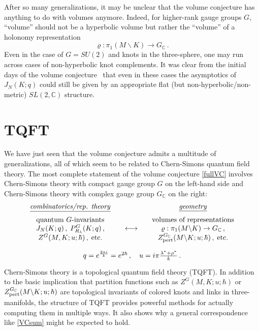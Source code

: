 \documentclass[letterpaper,12pt]{article}
\numberwithin{equation}{section}
\newcommand{\be}{\begin{equation}}
\newcommand{\ee}{\end{equation}}
\newcommand{\bs}{\backslash}
\newcommand{\C}{{\mathbb{C}}}
\renewcommand{\=}{\;=\;}
\begin{document}
After so many generalizations,
it may be unclear that the volume conjecture has anything to do with volumes anymore.
Indeed, for higher-rank gauge groups $G$,
``volume'' should not be a hyperbolic volume but rather
the ``volume'' of a holonomy representation
%
\be \varrho : \pi_1 (M\bs K) \to G_{\C}\,. \label{rhofirst} \ee
%
Even in the case of $G=SU(2)$ and knots in the three-sphere,
one may run across cases of non-hyperbolic knot complements.
It was clear from the initial days of the volume conjecture~\cite{Mur-Mur}
that even in these cases the asymptotics of $J_N(K;q)$
could still be given by an appropriate flat (but non-hyperbolic/non-metric) $SL(2,\C)$ structure.


\section{TQFT}
\label{sec:TQFT}

We have just seen that the volume conjecture admits a multitude of generalizations, all of which seem to be related to Chern-Simons quantum field theory. The most complete statement of the volume conjecture \eqref{fullVC} involves Chern-Simons theory with compact gauge group $G$ on the left-hand side and Chern-Simons theory with complex gauge group $G_\C$ on the right:
%
\be \begin{array}{ccc}
\underline{\text{\emph{combinatorics/rep. theory}}} && \underline{\text{\emph{geometry}}} \vspace{.2cm} \\
\text{quantum $G$-invariants} & & \text{volumes of representations} \\
  J_N(K;q)\,,\;P^G_{R_\lambda}(K;q)\,, &\quad\longleftrightarrow\quad & \varrho : \pi_1 (M\bs K) \to G_{\C} \,, \\
  Z^{G}(M,K;u;\hbar)\,,\;\text{etc.} &&  Z^{G_\C}_{\rm pert}(M\bs K;u;\hbar)\,,\;\text{etc.} \vspace{.4cm}  \\
\multicolumn{3}{c}{q=e^{\frac{2\pi i}{k}}=e^{2\hbar}\,,\quad u = i\pi\frac{\lambda^*+\rho^*}{k}\,. \vspace{.1cm}}
\end{array} \label{VCsum} \ee
%
Chern-Simons theory is a topological quantum field theory (TQFT).
In addition to the basic implication that partition functions such as $Z^{G}(M,K;u;\hbar)$ or $Z^{G_\C}_{\rm pert}(M\bs K;u;\hbar)$ are topological invariants of colored knots and links in three-manifolds, the structure of TQFT provides powerful methods for actually computing them in multiple ways.
It also shows why a general correspondence like \eqref{VCsum} might be expected to hold.
\end{document}
